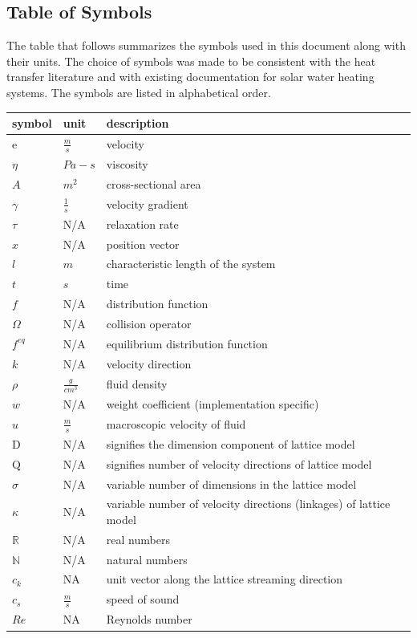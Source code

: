 \documentclass[12pt]{article}
\begin{document}
\subsection{Table of Symbols}

The table that follows summarizes the symbols used in this document along with
their units.  The choice of symbols was made to be consistent with the heat
transfer literature and with existing documentation for solar water heating
systems.  The symbols are listed in alphabetical order.

\renewcommand{\arraystretch}{1.2}
\noindent \begin{longtable*}{l l p{12cm}} \toprule
\textbf{symbol} & \textbf{unit} & \textbf{description}\\
\midrule 
$\mathrm{e}$ & $\frac{m}{s}$ & velocity
\\
$\eta$ & $Pa-s$ & viscosity
\\ 
$A$ & $m^2$ & cross-sectional area
\\
$\gamma$ & $\frac{1}{s}$ & velocity gradient
\\
$\tau$ & N/A & relaxation rate
\\
$x$ & N/A & position vector
\\
$l$ & $m$ & characteristic length of the system
\\
$t$ & $s$ & time
\\
$f$ & N/A & distribution function
\\
$\Omega$ & N/A & collision operator
\\
$f^{eq}$ & N/A & equilibrium distribution function
\\
$k$ & N/A & velocity direction
\\
$\rho$ & $\frac{g}{cm^3}$ & fluid density
\\
$w$ & N/A & weight coefficient (implementation specific)
\\
$u$ & $\frac{m}{s}$ & macroscopic velocity of fluid
\\
$\mathrm{D}$ & N/A & signifies the dimension component of lattice model
\\
$\mathrm{Q}$ & N/A & signifies number of velocity directions of lattice model
\\
$\sigma$ & N/A & variable number of dimensions in the lattice model
\\
$\kappa$ & N/A & variable number of velocity directions  (linkages) of lattice model
\\
$\mathbb{R}$ & N/A & real numbers
\\
$\mathbb{N}$ & N/A & natural numbers
\\
$c_k$ & NA & unit vector along the lattice streaming direction
\\
$c_s$ & $\frac{m}{s}$ & speed of sound
\\
$Re$ & NA & Reynolds number
\\
\bottomrule
\end{longtable*}
\end{document}

